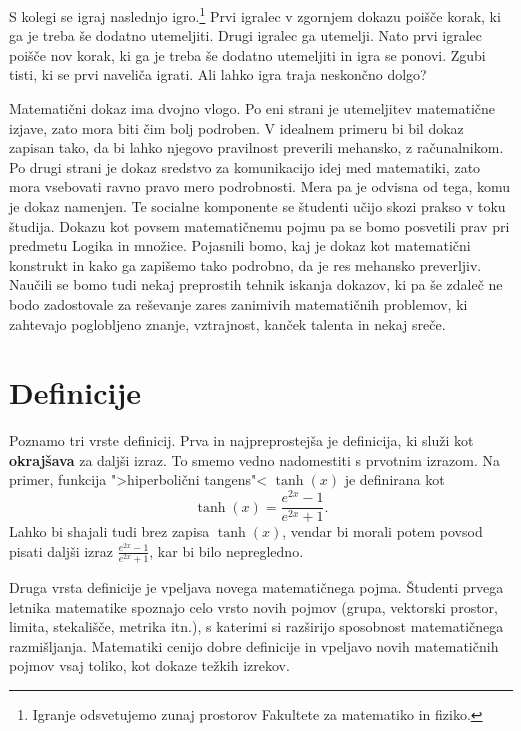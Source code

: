 \begin{vaja}
  S kolegi se igraj naslednjo igro.\footnote{%
    Igranje odsvetujemo zunaj prostorov Fakultete za matematiko in fiziko.}
  Prvi igralec v zgornjem dokazu poišče korak, ki ga je treba še dodatno
  utemeljiti. Drugi igralec ga utemelji. Nato prvi igralec poišče nov korak,
  ki ga je treba še dodatno utemeljiti in igra se ponovi. Zgubi tisti, ki se prvi naveliča igrati. Ali lahko igra traja neskončno dolgo?
\end{vaja}

Matematični dokaz ima dvojno vlogo. Po eni strani je utemeljitev matematične
izjave, zato mora biti čim bolj podroben. V idealnem primeru bi bil dokaz
zapisan tako, da bi lahko njegovo pravilnost preverili mehansko, z
računalnikom. Po drugi strani je dokaz sredstvo za komunikacijo idej med
matematiki, zato mora vsebovati ravno pravo mero podrobnosti. Mera pa je
odvisna od tega, komu je dokaz namenjen. Te socialne komponente se študenti
učijo skozi prakso v toku študija. Dokazu kot povsem matematičnemu pojmu pa se
bomo posvetili prav pri predmetu Logika in množice. Pojasnili bomo, kaj je
dokaz kot matematični konstrukt in kako ga zapišemo tako podrobno, da je res
mehansko preverljiv. Naučili se bomo tudi nekaj preprostih tehnik iskanja
dokazov, ki pa še zdaleč ne bodo zadostovale za reševanje zares zanimivih
matematičnih problemov, ki zahtevajo poglobljeno znanje, vztrajnost, kanček
talenta in nekaj sreče.



\section{Definicije}
\label{sec:definicije}


Poznamo tri vrste definicij. Prva in najpreprostejša je definicija, ki
služi kot \textbf{okrajšava} za daljši izraz. To smemo vedno nadomestiti
s prvotnim izrazom. Na primer, funkcija ">hiperbolični tangens"<
$\tanh(x)$ je definirana kot
%
\begin{equation*}
  \tanh(x) = \frac{e^{2 x} - 1}{e^{2 x} + 1}.
\end{equation*}
%
Lahko bi shajali tudi brez zapisa $\tanh(x)$, vendar bi morali potem
povsod pisati daljši izraz $\frac{e^{2 x} - 1}{e^{2 x} + 1}$, kar bi
bilo nepregledno.

Druga vrsta definicije je vpeljava novega matematičnega pojma.
Študenti prvega letnika matematike spoznajo celo vrsto novih pojmov
(grupa, vektorski prostor, limita, stekališče, metrika itn.), s
katerimi si razširijo sposobnost matematičnega razmišljanja.
Matematiki cenijo dobre definicije in vpeljavo novih matematičnih
pojmov vsaj toliko, kot dokaze težkih izrekov.

